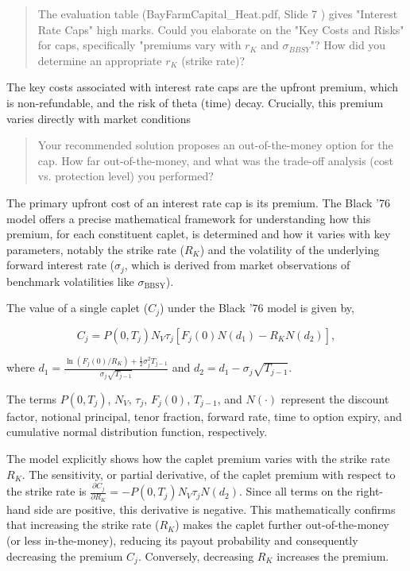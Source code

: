\documentclass[11pt, a4paper, british]{article}
\begin{document}
\newpage

\begin{quote}
    The evaluation table (BayFarmCapital_Heat.pdf, Slide 7 ) gives "Interest Rate Caps" high marks. Could you elaborate on the "Key Costs and Risks" for caps, specifically "premiums vary with $r_K$ and $\sigma_{BBSY}$"? How did you determine an appropriate $r_K$ (strike rate)?
\end{quote}

The key costs associated with interest rate caps are the upfront premium, which is non-refundable, and the risk of theta (time) decay. Crucially, this premium varies directly with market conditions

\newpage

\begin{quote}
    Your recommended solution proposes an out-of-the-money option for the cap. How far out-of-the-money, and what was the trade-off analysis (cost vs. protection level) you performed?
\end{quote}

The primary upfront cost of an interest rate cap is its premium. The Black '76 model offers a precise mathematical framework for understanding how this premium, for each constituent caplet, is determined and how it varies with key parameters, notably the strike rate ($R_K$) and the volatility of the underlying forward interest rate ($\sigma_j$, which is derived from market observations of benchmark volatilities like $\sigma_{\text{BBSY}}$).

The value of a single caplet ($C_j$) under the Black '76 model is given by,

$$C_j = P(0, T_j) N_V \tau_j \left[ F_j(0)N(d_1) - R_K N(d_2) \right],$$

where $d_1 = \frac{\ln(F_j(0)/R_K) + \frac{1}{2}\sigma_j^2 T_{j-1}}{\sigma_j \sqrt{T_{j-1}}}$ and $d_2 = d_1 - \sigma_j \sqrt{T_{j-1}}$. 

The terms $P(0,T_j)$, $N_V$, $\tau_j$, $F_j(0)$, $T_{j-1}$, and $N(\cdot)$ represent the discount factor, notional principal, tenor fraction, forward rate, time to option expiry, and cumulative normal distribution function, respectively.

The model explicitly shows how the caplet premium varies with the strike rate $R_K$. The sensitivity, or partial derivative, of the caplet premium with respect to the strike rate is $\frac{\partial C_j}{\partial R_K} = -P(0, T_j) N_V \tau_j N(d_2)$. Since all terms on the right-hand side are positive, this derivative is negative. This mathematically confirms that increasing the strike rate ($R_K$) makes the caplet further out-of-the-money (or less in-the-money), reducing its payout probability and consequently decreasing the premium $C_j$. Conversely, decreasing $R_K$ increases the premium.
\end{document}
